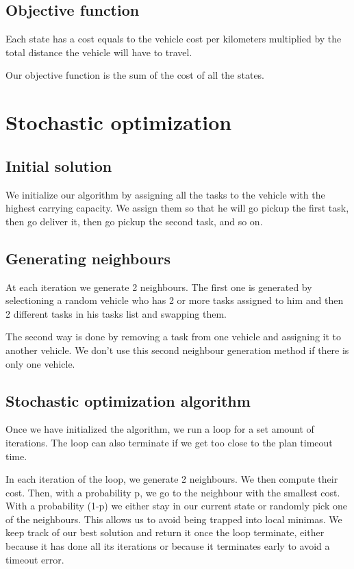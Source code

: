 \documentclass[11pt]{article}
\begin{document}
\subsection{Objective function}
Each state has a cost equals to the vehicle cost per kilometers multiplied by the total distance the vehicle will have to travel.

Our objective function is the sum of the cost of all the states.


\section{Stochastic optimization}

\subsection{Initial solution}
We initialize our algorithm by assigning all the tasks to the vehicle with the highest carrying capacity. We assign them so that he will go pickup the first task, then go deliver it, then go pickup the second task, and so on.

\subsection{Generating neighbours}
At each iteration we generate 2 neighbours. The first one is generated by selectioning a random vehicle who has 2 or more tasks assigned to him and then 2 different tasks in his tasks list and swapping them. 

The second way is done by removing a task from one vehicle and assigning it to another vehicle. We don't use this second neighbour generation method if there is only one vehicle.

\subsection{Stochastic optimization algorithm}
Once we have initialized the algorithm, we run a loop for a set amount of iterations. The loop can also terminate if we get too close to the plan timeout time.

In each iteration of the loop, we generate 2 neighbours. We then compute their cost. Then, with a probability p, we go to the neighbour with the smallest cost. With a probability (1-p) we either stay in our current state or randomly pick one of the neighbours. This allows us to avoid being trapped into local minimas. We keep track of our best solution and return it once the loop terminate, either because it has done all its iterations or because it terminates early to avoid a timeout error.
\end{document}
